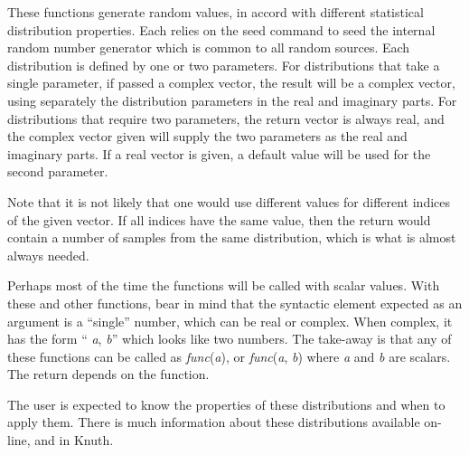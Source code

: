 These functions generate random values, in accord with different
statistical distribution properties.  Each relies on the {\cb seed}
command to seed the internal random number generator which is common
to all random sources.  Each distribution is defined by one or two
parameters.  For distributions that take a single parameter, if passed
a complex vector, the result will be a complex vector, using
separately the distribution parameters in the real and imaginary
parts.  For distributions that require two parameters, the return
vector is always real, and the complex vector given will supply the
two parameters as the real and imaginary parts.  If a real vector is
given, a default value will be used for the second parameter.

Note that it is not likely that one would use different values for
different indices of the given vector.  If all indices have the same
value, then the return would contain a number of samples from the same
distribution, which is what is almost always needed.

Perhaps most of the time the functions will be called with scalar
values.  With these and other functions, bear in mind that the
syntactic element expected as an argument is a ``single'' number,
which can be real or complex.  When complex, it has the form ``{\it
a\/}, {\it b\/}'' which looks like two numbers.  The take-away is that
any of these functions can be called as {\it func\/}({\it a\/}), or
{\it func\/}({\it a\/}, {\it b\/}) where {\it a} and {\it b} are
scalars.  The return depends on the function.

The user is expected to know the properties of these distributions and
when to apply them.  There is much information about these
distributions available on-line, and in Knuth.

